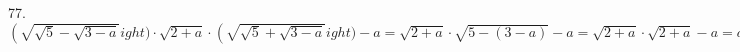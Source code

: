 77. $\left(\sqrt{\sqrt{5}-\sqrt{3-a}}
ight)\cdot\sqrt{2+a}\cdot\left(\sqrt{\sqrt{5}+\sqrt{3-a}}
ight)-a=
\sqrt{2+a}\cdot\sqrt{5-(3-a)}-a=\sqrt{2+a}\cdot\sqrt{2+a}-a=a+2-a=2.$\\
